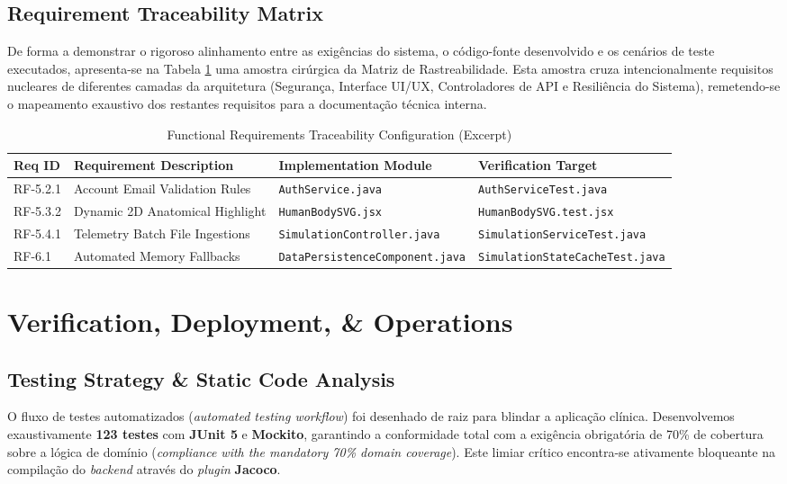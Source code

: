 \documentclass[11pt,a4paper]{article}
\begin{document}
\subsection{Requirement Traceability Matrix}
De forma a demonstrar o rigoroso alinhamento entre as exigências do sistema, o código-fonte desenvolvido e os cenários de teste executados, apresenta-se na Tabela \ref{tab:traceability_matrix} uma amostra cirúrgica da Matriz de Rastreabilidade. Esta amostra cruza intencionalmente requisitos nucleares de diferentes camadas da arquitetura (Segurança, Interface UI/UX, Controladores de API e Resiliência do Sistema), remetendo-se o mapeamento exaustivo dos restantes requisitos para a documentação técnica interna.

\begin{table}[H]
\footnotesize
\centering
\caption{Functional Requirements Traceability Configuration (Excerpt)}
\label{tab:traceability_matrix}
\renewcommand{\arraystretch}{1.2}
\begin{tabular}{llll}
\rowcolor{primaryblue} \textbf{\color{white}Req ID} & \textbf{\color{white}Requirement Description} & \textbf{\color{white}Implementation Module} & \textbf{\color{white}Verification Target} \\
\midrule
RF-5.2.1 & Account Email Validation Rules & \texttt{AuthService.java} & \texttt{AuthServiceTest.java} \\
\rowcolor{softgray} RF-5.3.2 & Dynamic 2D Anatomical Highlight & \texttt{HumanBodySVG.jsx} & \texttt{HumanBodySVG.test.jsx} \\
RF-5.4.1 & Telemetry Batch File Ingestions & \texttt{SimulationController.java} & \texttt{SimulationServiceTest.java} \\
\rowcolor{softgray} RF-6.1 & Automated Memory Fallbacks & \texttt{DataPersistenceComponent.java} & \texttt{SimulationStateCacheTest.java} \\
\bottomrule
\end{tabular}
\end{table}

\section{Verification, Deployment, \& Operations}

\subsection{Testing Strategy \& Static Code Analysis}
O fluxo de testes automatizados (\textit{automated testing workflow}) foi desenhado de raiz para blindar a aplicação clínica. Desenvolvemos exaustivamente \textbf{123 testes} com \textbf{JUnit 5} e \textbf{Mockito}, garantindo a conformidade total com a exigência obrigatória de 70\% de cobertura sobre a lógica de domínio (\textit{compliance with the mandatory 70\% domain coverage}). Este limiar crítico encontra-se ativamente bloqueante na compilação do \textit{backend} através do \textit{plugin} \textbf{Jacoco}.
\end{document}
